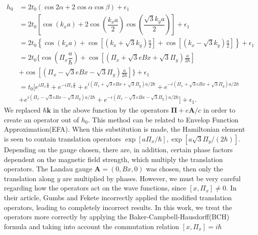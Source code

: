 \documentclass{report}
\newcommand{\f}[2]{\dfrac{#1}{#2}}
\begin{document}
\begin{equation}
	\begin{aligned}
		h_0
		 & = 2 t_0 \left(\cos2\alpha + 2\cos\alpha \cos\beta\right) + \epsilon_1                                                                                                                                     \\
		 & = 2t_{0} \left[ \cos(k_x a) + 2 \cos \left(\f{k_x a}{2}\right) \cos \left(\f{\sqrt{3}k_y a}{2}\right) \right] + \epsilon_1                                                                                \\
		 & = 2t_{0} \left\{ \cos(k_x a) + \cos\left[\left( k_{x} + \sqrt{3} k_{y} \right)\frac{a}{2}\right] + \cos\left[\left( k_{x} - \sqrt{3} k_{y} \right)\frac{a}{2}\right]\right\} + \epsilon_1                 \\
		 & = 2t_{0} \Biggl\{ \cos(\Pi_{x}\f{a}{\hbar}) + \cos \left[\left(\Pi_{x} + \sqrt{3} e B x + \sqrt{3} \Pi_{y}\right)\frac{a}{2\hbar}\right]                                                                  \\
		 & + \cos \left[\left(\Pi_{x} - \sqrt{3} e B x - \sqrt{3} \Pi_{y}\right)\frac{a}{2\hbar}\right] \Biggr\} + \epsilon_1                                                                                        \\
		 & = t_{0} \biggl[e^{i \Pi_{x}\frac{a}{\hbar}} + e^{-i\Pi_{x}\frac{a}{\hbar}} + e^{i(\Pi_{x} + \sqrt{3} eBx + \sqrt{3} \Pi_{y} ) a / 2\hbar} + e^{-i(\Pi_{x} + \sqrt{3} eBx + \sqrt{3} \Pi_{y} ) a / 2\hbar} \\
		 & + e^{i(\Pi_{x} - \sqrt{3} eBx - \sqrt{3} \Pi_{y} ) a / 2\hbar} + e^{-i(\Pi_{x} - \sqrt{3} eBx - \sqrt{3} \Pi_{y} ) a / 2\hbar} \biggr] + \epsilon_1.
	\end{aligned}
\end{equation}
We replaced $\hbar \mathbf{k}$ in the above function by the operators $\mathbf{\Pi} + e \mathbf{A} / c$ in order to create an operator out of $h_{0}$. This method can be related to Envelop Function Approximation(EFA). When this substitution is made, the Hamiltonian element is seen to contain translation operators $\exp[a \Pi_{x} / \hbar],\exp[a \sqrt{3} \Pi_{y} / (2\hbar)]$. Depending on the gauge chosen, there are, in addition, certain phase factors dependent on the magnetic field strength, which multiply the translation operators. The Landau gauge $\mathbf{A} = (0,Bx,0)$ was chosen, then only the translation along $y$ are multiplied by phases. \cite{PhysRevB.14.2239}However, we must be very careful regarding how the operators act on the wave functions, since $\left[x,\Pi_{x}\right] \neq 0$. In their article, Gumbs and Fekete \cite{gumps1997}  incorrectly applied the modified translation operators, leading to completely incorrect results. In this work, we treat the operators more correctly by applying the Baker-Campbell-Hausdorff(BCH) formula and taking into account the commutation relation $\left[x,\Pi_{x}\right] = i \hbar$
\end{document}
